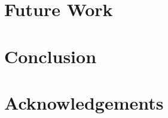 \documentclass[a4paper]{article}
\theoremstyle{definition}
\theoremstyle{remark}
\begin{document}
\section{Future Work}
\section{Conclusion}
\section*{Acknowledgements}
\printbibliography{}
\end{document}
